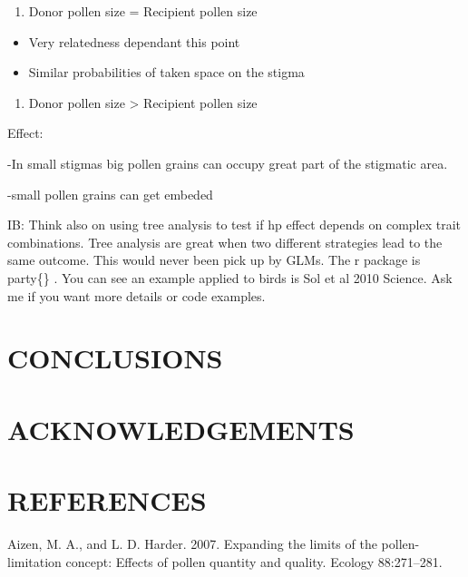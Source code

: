 \documentclass[11pt,a4paper]{article}
\providecommand{\tightlist}{%
  \setlength{\itemsep}{0pt}\setlength{\parskip}{0pt}}
\begin{document}
\begin{enumerate}
\def\labelenumi{\arabic{enumi})}
\setcounter{enumi}{1}
\tightlist
\item
  Donor pollen size = Recipient pollen size
\end{enumerate}

\begin{itemize}
\item
  Very relatedness dependant this point
\item
  Similar probabilities of taken space on the stigma
\end{itemize}

\begin{enumerate}
\def\labelenumi{\arabic{enumi})}
\setcounter{enumi}{2}
\tightlist
\item
  Donor pollen size \textgreater{} Recipient pollen size
\end{enumerate}

Effect:

-In small stigmas big pollen grains can occupy great part of the
stigmatic area.

-small pollen grains can get embeded

IB: Think also on using tree analysis to test if hp effect depends on
complex trait combinations. Tree analysis are great when two different
strategies lead to the same outcome. This would never been pick up by
GLMs. The r package is party\{\} . You can see an example applied to
birds is Sol et al 2010 Science. Ask me if you want more details or code
examples.

\section{CONCLUSIONS}\label{conclusions}

\section{ACKNOWLEDGEMENTS}\label{acknowledgements}

\section{REFERENCES}\label{references}

\hypertarget{refs}{}
\hypertarget{ref-aizen2007}{}
Aizen, M. A., and L. D. Harder. 2007. Expanding the limits of the
pollen-limitation concept: Effects of pollen quantity and quality.
Ecology 88:271--281.
\end{document}
